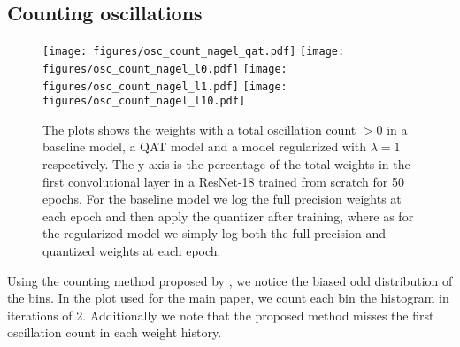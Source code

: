 \subsection{Counting oscillations}
\label{appendix:count_oscillations}
\begin{figure}[H]
    \centering
    \texttt{[image: figures/osc\_count\_nagel\_qat.pdf]}
    \hfill
    \texttt{[image: figures/osc\_count\_nagel\_l0.pdf]}
    \hfill
    \texttt{[image: figures/osc\_count\_nagel\_l1.pdf]}
    \hfill
    \texttt{[image: figures/osc\_count\_nagel\_l10.pdf]}
    \hfill
    \caption{The plots shows the weights with a total oscillation count $>0$ in a baseline model, a QAT model and a model regularized with $\lambda=1$ respectively. The y-axis is the percentage of the total weights in the first convolutional layer in a ResNet-18 trained from scratch for 50 epochs. For the baseline model we log the full precision weights at each epoch and then apply the quantizer after training, where as for the regularized model we simply log both the full precision and quantized weights at each epoch.}
    \label{}
\end{figure}
Using the counting method proposed by \citet{nagel2022overcoming}, we notice the biased odd distribution of the bins. In the plot used for the main paper, we count each bin the histogram in iterations of 2. Additionally we note that  the proposed method misses the first oscillation count in each weight history.

